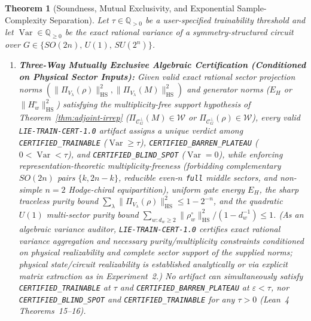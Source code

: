 \documentclass[11pt,a4paper]{article}
\newtheorem{theorem}{Theorem}[section]
\theoremstyle{definition}
\theoremstyle{remark}
\newcommand{\QQ}{\mathbb{Q}}
\newcommand{\Var}{\operatorname{Var}}
\newcommand{\HS}{\mathrm{HS}}
\newcommand{\certschema}{\texttt{LIE-TRAIN-CERT-1.0}}
\begin{document}
\begin{theorem}[Soundness, Mutual Exclusivity, and Exponential Sample-Complexity Separation]\label{thm:cert}
Let $\tau \in \QQ_{>0}$ be a user-specified trainability threshold and let $\Var \in \QQ_{\ge 0}$ be the exact rational variance of a symmetry-structured circuit over $G \in \{SO(2n),\, U(1),\, SU(2^n)\}$.
\begin{enumerate}[leftmargin=1.8em,itemsep=2pt]
  \item \textbf{Three-Way Mutually Exclusive Algebraic Certification (Conditioned on Physical Sector Inputs):} Given valid exact rational sector projection norms $(\|\Pi_{V_\lambda}(\rho)\|_{\HS}^2, \|\Pi_{V_\lambda}(M)\|_{\HS}^2)$ and generator norms ($E_H$ or $\|H_w^\circ\|_{\HS}^2$) satisfying the multiplicity-free support hypothesis of Theorem~\ref{thm:adjoint-irrep} ($\Pi_{\mathcal{C}_G^\perp}(M) \in \mathcal{W}$ or $\Pi_{\mathcal{C}_G^\perp}(\rho) \in \mathcal{W}$), every valid \certschema{} artifact assigns a unique verdict among \texttt{CERTIFIED\_\allowbreak TRAINABLE} ($\Var \ge \tau$), \texttt{CERTIFIED\_\allowbreak BARREN\_\allowbreak PLATEAU} ($0 < \Var < \tau$), and \texttt{CERTIFIED\_\allowbreak BLIND\_\allowbreak SPOT} ($\Var = 0$), while enforcing representation-theoretic multiplicity-freeness (forbidding complementary $SO(2n)$ pairs $\{k, 2n-k\}$, reducible even-$n$ \texttt{full} middle sectors, and non-simple $n=2$ Hodge-chiral equipartition), uniform gate energy $E_H$, the sharp traceless purity bound $\sum_\lambda \|\Pi_{V_\lambda}(\rho)\|_{\HS}^2 \le 1 - 2^{-n}$, and the quadratic $U(1)$ multi-sector purity bound $\sum_{w: d_w \ge 2} \|\rho_w^\circ\|_{\HS}^2 / (1 - d_w^{-1}) \le 1$. (As an algebraic variance auditor, \certschema{} certifies exact rational variance aggregation and necessary purity/multiplicity constraints conditioned on physical realizability and complete sector support of the supplied norms; physical state/circuit realizability is established analytically or via explicit matrix extraction as in Experiment~2.) No artifact can simultaneously satisfy \texttt{CERTIFIED\_\allowbreak TRAINABLE} at $\tau$ and \texttt{CERTIFIED\_\allowbreak BARREN\_\allowbreak PLATEAU} at $\varepsilon < \tau$, nor \texttt{CERTIFIED\_\allowbreak BLIND\_\allowbreak SPOT} and \texttt{CERTIFIED\_\allowbreak TRAINABLE} for any $\tau > 0$ (Lean~4 Theorems~15--16).

\end{enumerate}
\end{theorem}
\end{document}
